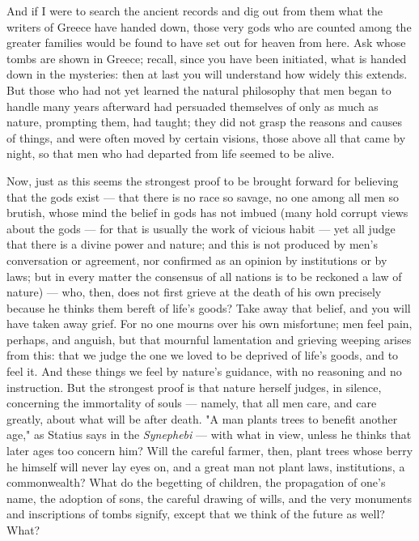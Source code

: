  And if I were to search the ancient records and dig out from them what the writers of Greece have handed down, those very gods who are counted among the greater families would be found to have set out for heaven from here. Ask whose tombs are shown in Greece; recall, since you have been initiated, what is handed down in the mysteries: then at last you will understand how widely this extends. But those who had not yet learned the natural philosophy that men began to handle many years afterward had persuaded themselves of only as much as nature, prompting them, had taught; they did not grasp the reasons and causes of things, and were often moved by certain visions, those above all that came by night, so that men who had departed from life seemed to be alive.

 Now, just as this seems the strongest proof to be brought forward for believing that the gods exist — that there is no race so savage, no one among all men so brutish, whose mind the belief in gods has not imbued (many hold corrupt views about the gods — for that is usually the work of vicious habit — yet all judge that there is a divine power and nature; and this is not produced by men's conversation or agreement, nor confirmed as an opinion by institutions or by laws; but in every matter the consensus of all nations is to be reckoned a law of nature) — who, then, does not first grieve at the death of his own precisely because he thinks them bereft of life's goods? Take away that belief, and you will have taken away grief. For no one mourns over his own misfortune; men feel pain, perhaps, and anguish, but that mournful lamentation and grieving weeping arises from this: that we judge the one we loved to be deprived of life's goods, and to feel it. And these things we feel by nature's guidance, with no reasoning and no instruction. But the strongest proof is that nature herself judges, in silence, concerning the immortality of souls — namely, that all men care, and care greatly, about what will be after death. "A man plants trees to benefit another age," as Statius says in the \textit{Synephebi} — with what in view, unless he thinks that later ages too concern him? Will the careful farmer, then, plant trees whose berry he himself will never lay eyes on, and a great man not plant laws, institutions, a commonwealth? What do the begetting of children, the propagation of one's name, the adoption of sons, the careful drawing of wills, and the very monuments and inscriptions of tombs signify, except that we think of the future as well? What?


